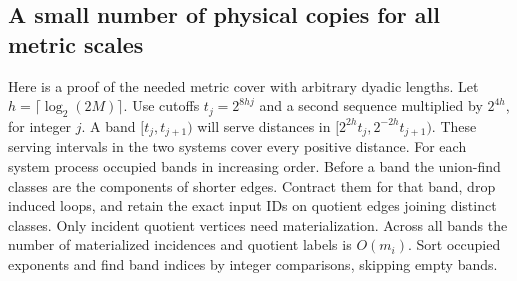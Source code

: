 \documentclass[11pt]{article}
\begin{document}
\hypertarget{a-small-number-of-physical-copies-for-all-metric-scales}{%
\subsection{A small number of physical copies for all metric scales}\label{a-small-number-of-physical-copies-for-all-metric-scales}}

Here is a proof of the needed metric cover with arbitrary dyadic lengths. Let \(h=\lceil\log_2(2M)\rceil\). Use cutoffs \(t_j=2^{8hj}\) and a second sequence multiplied by \(2^{4h}\), for integer \(j\). A band \([t_j,t_{j+1})\) will serve distances in \([2^{2h}t_j,2^{-2h}t_{j+1})\). These serving intervals in the two systems cover every positive distance. For each system process occupied bands in increasing order. Before a band the union-find classes are the components of shorter edges. Contract them for that band, drop induced loops, and retain the exact input IDs on quotient edges joining distinct classes. Only incident quotient vertices need materialization. Across all bands the number of materialized incidences and quotient labels is \(O(m_i)\). Sort occupied exponents and find band indices by integer comparisons, skipping empty bands.
\end{document}
